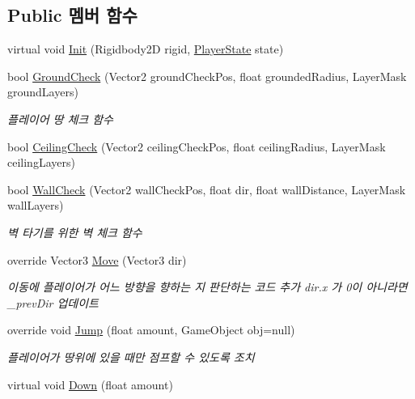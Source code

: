 \subsection*{Public 멤버 함수}
\begin{DoxyCompactItemize}
\item 
virtual void \mbox{\hyperlink{class_player_movement_a104a453051ca7b60d6862e4deb7475b4}{Init}} (Rigidbody2D rigid, \mbox{\hyperlink{class_player_state}{Player\+State}} state)
\item 
bool \mbox{\hyperlink{class_player_movement_a957f2e09268831052dbd00a9e8e4fa70}{Ground\+Check}} (Vector2 ground\+Check\+Pos, float grounded\+Radius, Layer\+Mask ground\+Layers)
\begin{DoxyCompactList}\small\item\em 플레이어 땅 체크 함수 \end{DoxyCompactList}\item 
bool \mbox{\hyperlink{class_player_movement_a6f9b40c6b4bb2fcb47c3c0b8f17a81b8}{Ceiling\+Check}} (Vector2 ceiling\+Check\+Pos, float ceiling\+Radius, Layer\+Mask ceiling\+Layers)
\item 
bool \mbox{\hyperlink{class_player_movement_ad878c661ddfc72890b353a01943f9161}{Wall\+Check}} (Vector2 wall\+Check\+Pos, float dir, float wall\+Distance, Layer\+Mask wall\+Layers)
\begin{DoxyCompactList}\small\item\em 벽 타기를 위한 벽 체크 함수 \end{DoxyCompactList}\item 
override Vector3 \mbox{\hyperlink{class_player_movement_a94c480a9aa5629d78b5fd16d9a814bb7}{Move}} (Vector3 dir)
\begin{DoxyCompactList}\small\item\em 이동에 플레이어가 어느 방향을 향하는 지 판단하는 코드 추가 dir.\+x 가 0이 아니라면 \+\_\+prev\+Dir 업데이트 \end{DoxyCompactList}\item 
override void \mbox{\hyperlink{class_player_movement_a347d6bcd5389bbc6b115c2bdf33e8f29}{Jump}} (float amount, Game\+Object obj=null)
\begin{DoxyCompactList}\small\item\em 플레이어가 땅위에 있을 때만 점프할 수 있도록 조치 \end{DoxyCompactList}\item 
virtual void \mbox{\hyperlink{class_player_movement_ae4905085466c9d84cc032807f704fb41}{Down}} (float amount)
\item 

\end{DoxyCompactItemize}
